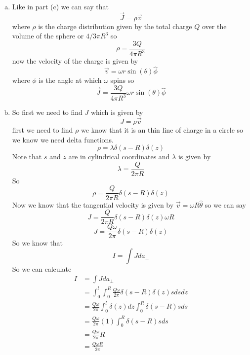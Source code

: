 \documentclass[11pt]{article}
\numberwithin{equation}{section}
\begin{document}
\begin{enumerate}[(a)]
\item
Like in part (c) we can say that 
$$\vec{J}=\rho \vec{v}$$
where $\rho$ is the charge distribution given by the total charge $Q$ over the volume of the sphere or $4/3\pi R^3$ so
$$\rho = \frac{3Q}{4\pi R^3}$$
now the velocity of the charge is given by
$$\vec{v} = \omega r\sin(\theta) \hat{\phi}$$
where $\phi$ is the angle at which $\omega$ spins so
$$\vec{J} = \frac{3Q}{4\pi R^3}\omega r\sin(\theta)\hat{\phi}$$
\item
So first we need to find $J$ which is given by
$$J = \rho\vec{v}$$
first we need to find $\rho$ we know that it is an thin line of charge in a circle so we know we need delta functions.
$$\rho = \lambda\delta(s-R)\delta(z)$$
Note that $s$ and $z$ are in cylindrical coordinates and $\lambda$ is given by
$$\lambda = \frac{Q}{2\pi R}$$
So 
$$\rho = \frac{Q}{2\pi R}\delta(s-R)\delta(z)$$
Now we know that the tangential velocity is given by $\vec{v} = \omega R\hat{\theta}$ so we can say
$$J = \frac{Q}{2\pi R}\delta(s-R)\delta(z)\omega R$$
$$J = \frac{Q\omega}{2\pi}\delta(s-R)\delta(z)$$
So we know that 
$$I = \int J da_{\perp}$$
So we can calculate
\begin{align*}
I &= \int J da_{\perp}\\
 &= \int_0^{l}\int_0^{R}\frac{Q\omega}{2\pi}\delta(s-R)\delta(z) sdsdz\\
 &= \frac{Q\omega}{2\pi}\int_0^{l}\delta(z)dz\int_0^{R}\delta(s-R) sds\\
 &= \frac{Q\omega}{2\pi}(1)\int_0^{R}\delta(s-R) sds\\
 &= \frac{Q\omega}{2\pi}R\\
 &= \frac{Q\omega R}{2\pi}
\end{align*}
\end{enumerate}
\end{document}
